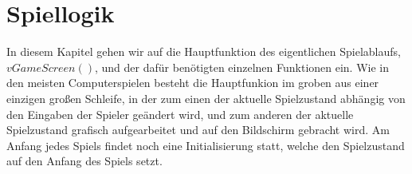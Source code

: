 
\chapter{Spiellogik}
\label{Spiel_Logik}
%
In diesem Kapitel gehen wir auf die Hauptfunktion des eigentlichen Spielablaufs, $vGameScreen()$, und der daf{\"u}r ben{\"o}tigten einzelnen Funktionen ein. Wie in den meisten Computerspielen besteht die Hauptfunkion im groben aus einer einzigen gro{\ss}en Schleife, in der zum einen der aktuelle Spielzustand abh{\"a}ngig von den Eingaben der Spieler ge{\"a}ndert wird, und zum anderen der aktuelle Spielzustand grafisch aufgearbeitet und auf den Bildschirm gebracht wird. Am Anfang jedes Spiels findet noch eine Initialisierung statt, welche den Spielzustand auf den Anfang des Spiels setzt.
%


